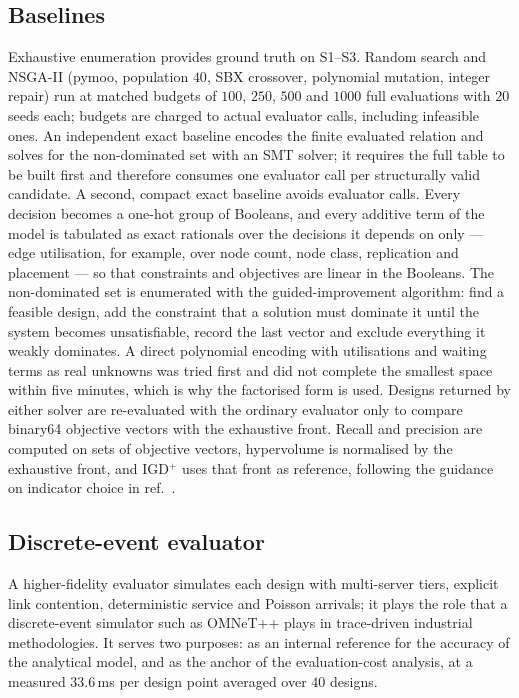 \documentclass[pdflatex,sn-nature,lineno]{sn-jnl}
\newcommand{\DesCostMs}{33.6}
\begin{document}
\subsection{Baselines}
Exhaustive enumeration provides ground truth on S1--S3. Random search and
NSGA-II\cite{deb2002nsga2} (pymoo\cite{blank2020pymoo}, population $40$, SBX crossover,
polynomial mutation, integer repair) run at matched budgets of $100$, $250$, $500$ and
$1000$ full evaluations with $20$ seeds each; budgets are charged to actual evaluator
calls, including infeasible ones. An independent exact baseline encodes the finite
evaluated relation and solves for the non-dominated set with an SMT
solver\cite{demoura2008z3}; it requires the full table to be built first and therefore
consumes one evaluator call per structurally valid candidate. A second, compact exact
baseline avoids evaluator calls. Every decision becomes a one-hot group of Booleans, and
every additive term of the model is tabulated as exact rationals over the decisions it
depends on only --- edge utilisation, for example, over node count, node class,
replication and placement --- so that constraints and objectives are linear in the
Booleans. The non-dominated set is enumerated with the guided-improvement algorithm: find
a feasible design, add the constraint that a solution must dominate it until the system
becomes unsatisfiable, record the last vector and exclude everything it weakly dominates.
A direct polynomial encoding with utilisations and waiting terms as real unknowns was
tried first and did not complete the smallest space within five minutes, which is why the
factorised form is used. Designs returned by either solver are re-evaluated with the
ordinary evaluator only to compare binary64 objective vectors with the exhaustive front.
Recall and precision are
computed on sets of objective vectors, hypervolume\cite{zitzler1999hv} is normalised by
the exhaustive front, and IGD$^{+}$\cite{ishibuchi2015igdplus} uses that front as
reference, following the guidance on indicator choice in ref.~.

\subsection{Discrete-event evaluator}
A higher-fidelity evaluator simulates each design with multi-server tiers, explicit link
contention, deterministic service and Poisson arrivals; it plays the role that a
discrete-event simulator such as OMNeT++\cite{varga2008omnet} plays in trace-driven
industrial methodologies\cite{saadatmand2025compdse}. It serves two purposes: as an
internal reference for the accuracy of the analytical model, and as the anchor of the
evaluation-cost analysis, at a measured $\DesCostMs$\,ms per design point averaged over
$40$ designs.
\end{document}
